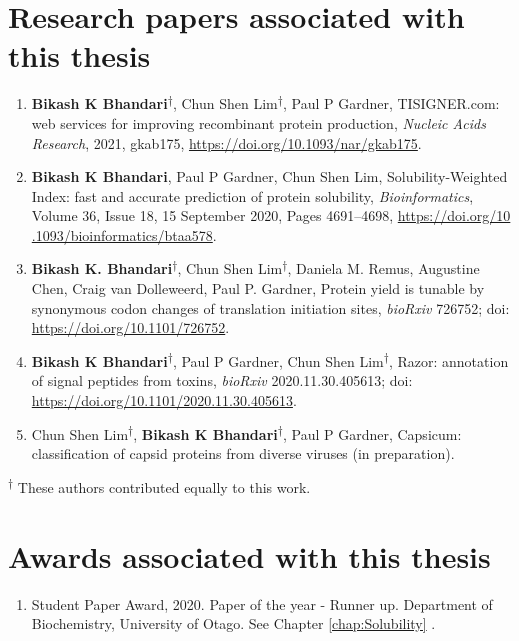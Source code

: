 \section*{Research papers associated with this thesis}
\begin{enumerate}
	
		
	\item \textbf{Bikash K Bhandari}\textsuperscript{$\dagger$}, Chun Shen Lim\textsuperscript{$\dagger$}, Paul P Gardner, TISIGNER.com: web services for improving recombinant protein production, \textit{Nucleic Acids Research}, 2021, gkab175, \href{https://doi.org/10.1093/nar/gkab175}{https://doi.org/10.1093/nar/gkab175}.
	
	\item \textbf{Bikash K Bhandari}, Paul P Gardner, Chun Shen Lim, Solubility-Weighted Index: fast and accurate prediction of protein solubility, \textit{Bioinformatics}, Volume 36, Issue 18, 15 September 2020, Pages 4691–4698, \href{https://doi.org/10.1093/bioinformatics/btaa578}{https://doi.org/10\\.1093/bioinformatics/btaa578}.
	
	\item \textbf{Bikash K. Bhandari}\textsuperscript{$\dagger$}, Chun Shen Lim\textsuperscript{$\dagger$}, Daniela M. Remus, Augustine Chen, Craig van Dolleweerd, Paul P. Gardner, Protein yield is tunable by synonymous codon changes of translation initiation sites, \textit{bioRxiv} 726752; doi: \href{https://doi.org/10.1101/726752}{https://doi.org/10.1101/726752}.
	
	
	\item \textbf{Bikash K Bhandari}\textsuperscript{$\dagger$}, Paul P Gardner, Chun Shen Lim\textsuperscript{$\dagger$}, Razor: annotation of signal peptides from toxins, \textit{bioRxiv} 2020.11.30.405613; doi: \href{https://doi.org/10.1101/2020.11.30.405613}{https://doi.org/10.1101/2020.11.30.405613}.
	
	\item Chun Shen Lim\textsuperscript{$\dagger$}, \textbf{Bikash K Bhandari}\textsuperscript{$\dagger$}, Paul P Gardner, Capsicum: classification of capsid proteins from diverse viruses (in preparation).


	
\end{enumerate}

\textsuperscript{$\dagger$} These authors contributed equally to this work.



\section*{Awards associated with this thesis}
\begin{enumerate}
	\item Student Paper Award, 2020. Paper of the year - Runner up. Department of Biochemistry, University of Otago. See Chapter \ref{chap:Solubility}  \cite{Bhandari2020-pz}.

\end{enumerate}
